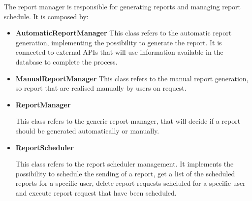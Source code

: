 \documentclass{article}
\begin{document}
The report manager is responsible for generating reports and managing report schedule. It is composed by:

\begin{itemize}

\item \textbf{AutomaticReportManager}
This class refers to the automatic report generation, implementing the possibility to generate the report. It is connected to external APIs that will use information available in the database to complete the process.

\item \textbf{ManualReportManager}
This class refers to the manual report generation, so report that are realised manually by users on request.

\item \textbf{ReportManager}

This class refers to the generic report manager, that will decide if a report should be generated automatically or manually.

\item \textbf{ReportScheduler}

This class refers to the report scheduler management. It implements the possibility to schedule the sending of a report, get a list of the scheduled reports for a specific user, delete report requests scheluled for a specific user and execute report request that have been scheduled.

\end{itemize}
\end{document}
